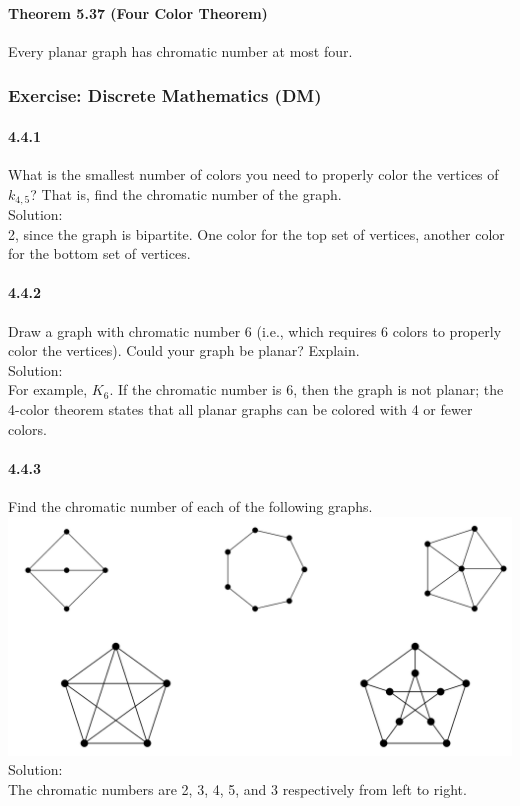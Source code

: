 \documentclass{article}
\begin{document}
\paragraph{Theorem 5.37 (Four Color Theorem)}
Every planar graph has chromatic number at most
four.
\subsubsection{Exercise: Discrete Mathematics (DM)}
\paragraph{4.4.1}
What is the smallest number of colors you need to properly color the vertices of $k_{4,5}$? That is, find the chromatic number of the graph.\\
Solution:\\
2, since the graph is bipartite. One color for the top set of vertices, another color for the bottom set of vertices.
\paragraph{4.4.2}
Draw a graph with chromatic number 6 (i.e., which requires 6 colors to properly color the vertices). Could your graph be planar? Explain.\\
Solution:\\
For example, $K_6$. If the chromatic number is 6, then the graph is not planar; the 4-color theorem states that all planar graphs can be colored with 4 or fewer colors.
\paragraph{4.4.3}
Find the chromatic number of each of the following graphs.\\
\includegraphics{0113}
Solution:\\
The chromatic numbers are 2, 3, 4, 5, and 3 respectively from left to right.
\end{document}
